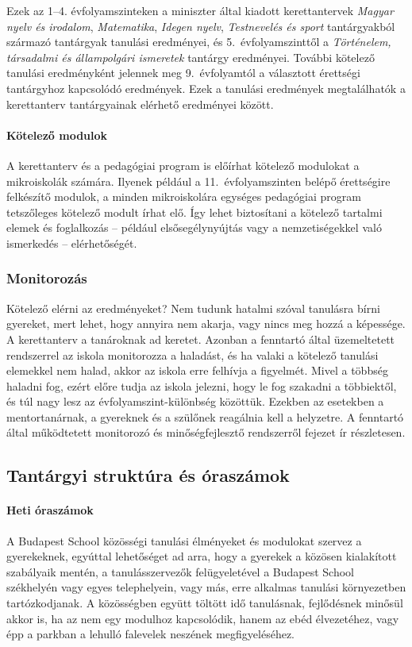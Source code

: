 Ezek az 1--4. évfolyamszinteken a miniszter által kiadott kerettantervek \emph{Magyar nyelv és irodalom}, \emph{Matematika}, \emph{Idegen nyelv}, \emph{Testnevelés és sport} tantárgyakból származó tantárgyak tanulási eredményei, és 5.~évfolyamszinttől a \emph{Történelem, társadalmi és állampolgári ismeretek} tantárgy eredményei. További kötelező tanulási eredményként jelennek meg 9.~évfolyamtól a választott érettségi tantárgyhoz kapcsolódó eredmények. Ezek a tanulási eredmények megtalálhatók a kerettanterv tantárgyainak elérhető eredményei között.

\paragraph{Kötelező modulok}
A kerettanterv és a pedagógiai program is előírhat kötelező modulokat a mikroiskolák számára. Ilyenek például a 11.~évfolyamszinten belépő érettségire felkészítő modulok, a minden mikroiskolára egységes pedagógiai program tetszőleges kötelező modult írhat elő. Így lehet biztosítani a kötelező tartalmi elemek és foglalkozás -- például elsősegélynyújtás vagy a nemzetiségekkel való ismerkedés -- elérhetőségét.

\subsubsection{Monitorozás}

Kötelező elérni az eredményeket? Nem tudunk hatalmi szóval tanulásra bírni gyereket, mert lehet, hogy annyira nem akarja, vagy nincs meg hozzá a képessége. A kerettanterv a tanároknak ad keretet. Azonban a fenntartó által üzemeltetett rendszerrel az iskola  monitorozza a haladást, és ha valaki a kötelező tanulási elemekkel nem halad, akkor az iskola erre felhívja a figyelmét. Mivel a többség haladni fog, ezért előre tudja az iskola jelezni, hogy le fog szakadni a többiektől, és túl nagy lesz az évfolyamszint-különbség közöttük. Ezekben az esetekben a mentortanárnak, a gyereknek és a szülőnek reagálnia kell a helyzetre. A fenntartó által működtetett monitorozó és minőségfejlesztő rendszerről  fejezet ír részletesen.


\subsection{Tantárgyi struktúra és óraszámok}
\label{sec:tantargyi_struktura}
\paragraph{Heti óraszámok} 
A Budapest School közösségi tanulási élményeket és modulokat szervez a gyerekeknek, egyúttal lehetőséget ad arra, hogy a gyerekek a közösen kialakított szabályaik mentén, a tanulásszervezők felügyeletével a Budapest School székhelyén vagy egyes telephelyein, vagy más, erre alkalmas tanulási környezetben tartózkodjanak. A közösségben együtt töltött idő tanulásnak, fejlődésnek minősül akkor is, ha az nem egy modulhoz kapcsolódik, hanem az ebéd élvezetéhez, vagy épp a parkban a lehulló falevelek neszének megfigyeléséhez.

